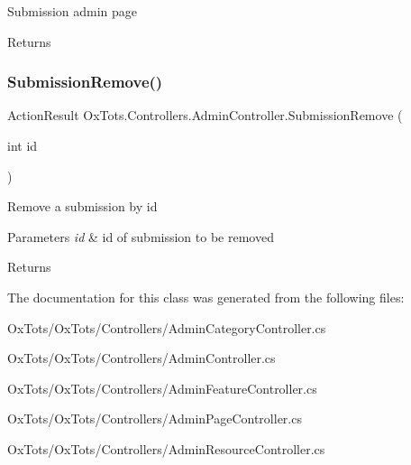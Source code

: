 Submission admin page 

\begin{DoxyReturn}{Returns}

\end{DoxyReturn}
\mbox{\label{class_ox_tots_1_1_controllers_1_1_admin_controller_a9d7879d9489418324413328fe639eb73}} 
\subsubsection{\texorpdfstring{SubmissionRemove()}{SubmissionRemove()}}
{\footnotesize\ttfamily Action\+Result Ox\+Tots.\+Controllers.\+Admin\+Controller.\+Submission\+Remove (\begin{DoxyParamCaption}\item[{int}]{id }\end{DoxyParamCaption})\hspace{0.3cm}{\ttfamily [inline]}}



Remove a submission by id 


\begin{DoxyParams}{Parameters}
{\em id} & id of submission to be removed\\
\hline
\end{DoxyParams}
\begin{DoxyReturn}{Returns}

\end{DoxyReturn}


The documentation for this class was generated from the following files\+:\begin{DoxyCompactItemize}
\item 
Ox\+Tots/\+Ox\+Tots/\+Controllers/Admin\+Category\+Controller.\+cs\item 
Ox\+Tots/\+Ox\+Tots/\+Controllers/Admin\+Controller.\+cs\item 
Ox\+Tots/\+Ox\+Tots/\+Controllers/Admin\+Feature\+Controller.\+cs\item 
Ox\+Tots/\+Ox\+Tots/\+Controllers/Admin\+Page\+Controller.\+cs\item 
Ox\+Tots/\+Ox\+Tots/\+Controllers/Admin\+Resource\+Controller.\+cs\end{DoxyCompactItemize}
